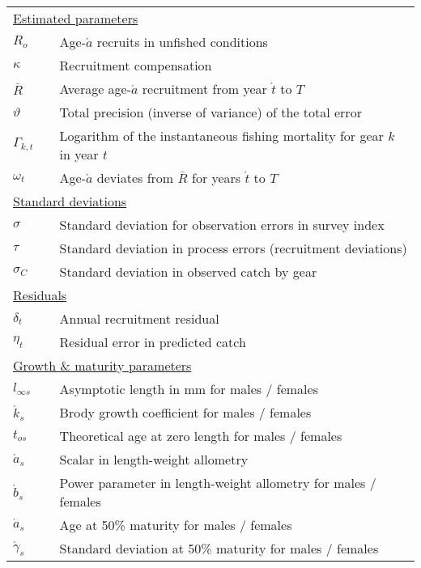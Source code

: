 \begin{table}[b]
\begin{tabular}{lll}
\multicolumn{3}{l}{\underline{Estimated parameters}}\\
$R_o$            & & Age-$\acute{a}$ recruits in unfished conditions\\
$\kappa$         & & Recruitment compensation\\
$\bar{R}$        & & Average age-$\acute{a}$ recruitment from year $\acute{t}$ to $T$\\
$\vartheta$      & & Total precision (inverse of variance) of the total error\\
$\Gamma_{k,t}$    & & Logarithm of the instantaneous fishing mortality for gear $k$ in year $t$\\
$\omega_t$       & & Age-$\acute{a}$ deviates from $\bar{R}$ for years $\acute{t}$ to $T$\\
\multicolumn{3}{l}{\underline{Standard deviations}}\\
$\sigma$         & & Standard deviation for observation errors in survey index\\
$\tau$           & & Standard deviation in process errors (recruitment deviations)\\
$\sigma_C$       & & Standard deviation in observed catch by gear\\
\multicolumn{3}{l}{\underline{Residuals}}\\
$\delta_t$       &   & Annual recruitment residual\\
$\eta_t$         &   & Residual error in predicted catch\\
\multicolumn{3}{l}{\underline{Growth \& maturity parameters}}\\
$l_{\infty  s}$     & &  Asymptotic length in mm for males / females \\
$\acute{k}_s$    & & Brody growth coefficient for males / females \\
$t_{o s}$         & & Theoretical age at zero length for males / females \\
$\acute{a}_s$    & &  Scalar in length-weight allometry\\
$\acute{b}_s$    & & Power parameter in length-weight allometry for males / females\\
$\dot{a}_s$      & & Age at 50\% maturity for males / females \\
$\acute{\gamma}_s$ & & Standard deviation at 50\% maturity for males / females\\
\hline
\end{tabular}
\end{table}

